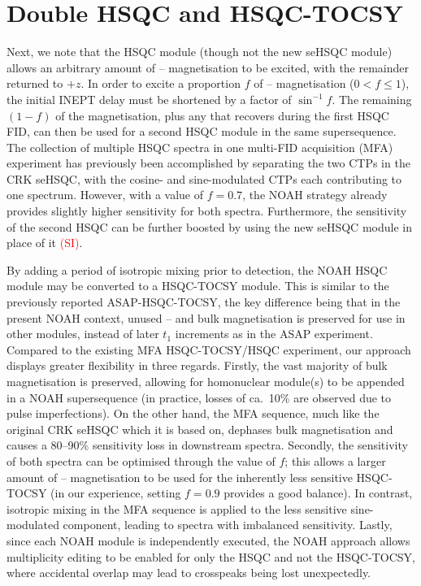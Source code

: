 \documentclass[11pt]{article}
\newcommand*{\carbon}{\ce{^{13}C}}
\newcommand*{\proton}{\ce{^{1}H}}
\newcommand*{\red}[1]{\textcolor{red}{#1}}
\newcommand*{\sitodo}{\red{(SI)}}
\begin{document}
\section*{Double HSQC and HSQC-TOCSY}

Next, we note that the HSQC module (though not the new seHSQC module) allows an arbitrary amount of \carbon{}--\proton{} magnetisation to be excited, with the remainder returned to $+z$.  In order to excite a proportion $f$ of \carbon{}--\proton{} magnetisation ($0 < f \leq 1$), the initial INEPT delay must be shortened by a factor of $\sin^{-1}f$.
The remaining $(1 - f)$ of the magnetisation, plus any that recovers during the first HSQC FID, can then be used for a second HSQC module in the same supersequence.
The collection of multiple HSQC spectra in one multi-FID acquisition (MFA) experiment has previously been accomplished by separating the two CTPs in the CRK seHSQC, with the cosine- and sine-modulated CTPs each contributing to one spectrum.\autocite{ctphsqc}
However, with a value of $f = 0.7$, the NOAH strategy already provides slightly higher sensitivity for both spectra.
Furthermore, the sensitivity of the second HSQC can be further boosted by using the new seHSQC module in place of it \sitodo{}.

By adding a period of isotropic mixing prior to detection, the NOAH HSQC module may be converted to a HSQC-TOCSY module.
This is similar to the previously reported ASAP-HSQC-TOCSY,\autocite{Becker2019JMR} the key difference being that in the present NOAH context, unused \carbon{}--\proton{} and bulk magnetisation is preserved for use in other modules, instead of later $t_1$ increments as in the ASAP experiment.
Compared to the existing MFA HSQC-TOCSY/HSQC experiment,\autocite{Nolis2019CPC} our approach displays greater flexibility in three regards.
Firstly, the vast majority of bulk magnetisation is preserved, allowing for homonuclear module(s) to be appended in a NOAH supersequence (in practice, losses of ca.\ 10\% are observed due to pulse imperfections).
On the other hand, the MFA sequence, much like the original CRK seHSQC which it is based on, dephases bulk magnetisation and causes a 80--90\% sensitivity loss in downstream spectra.
Secondly, the sensitivity of both spectra can be optimised through the value of $f$; this allows a larger amount of \carbon{}--\proton{} magnetisation to be used for the inherently less sensitive HSQC-TOCSY (in our experience, setting $f = 0.9$ provides a good balance).
In contrast, isotropic mixing in the MFA sequence is applied to the less sensitive sine-modulated component, leading to spectra with imbalanced sensitivity.
Lastly, since each NOAH module is independently executed, the NOAH approach allows multiplicity editing to be enabled for only the HSQC and not the HSQC-TOCSY, where accidental overlap may lead to crosspeaks being lost unexpectedly.
\end{document}
